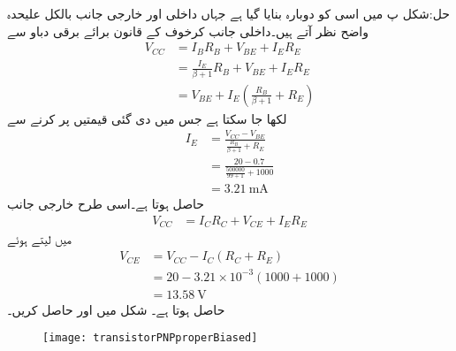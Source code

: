 حل:شکل  پ میں اسی کو دوبارہ بنایا گیا ہے جہاں داخلی اور خارجی جانب بالکل علیحدہ واضح نظر آتے ہیں۔داخلی جانب کرخوف کے قانون برائے برقی دباو سے
\begin{align*}
V_{CC}&=I_B R_B +V_{BE}+I_E R_E \\
&=\frac{I_E}{\beta +1} R_B + V_{BE}+I_E R_E\\
&=V_{BE}+I_E \left(\frac{R_B}{\beta+1}+R_E \right)
\end{align*}
لکھا جا سکتا ہے جس میں دی گئی قیمتیں پر کرنے سے
\begin{align*}
I_E&=\frac{V_{CC}-V_{BE}}{\frac{R_B}{\beta+1}+R_E}\\
&=\frac{20-0.7}{\frac{500000}{99+1}+1000}\\
&=\SI{3.21}{\milli \ampere}
\end{align*}
حاصل ہوتا ہے۔اسی طرح خارجی جانب 
\begin{align*}
V_{CC}&=I_C R_C +V_{CE}+I_E R_E
\end{align*}
میں  لیتے ہوئے
\begin{align*}
V_{CE}&=V_{CC}-I_C \left(R_C+R_E \right)\\
&=20-3.21 \times 10^{-3} \left(1000+1000 \right)\\
&=\SI{13.58}{\volt}
\end{align*}
حاصل ہوتا ہے۔
شکل  میں  اور  حاصل کریں۔
\begin{figure}
\centering
\texttt{[image: transistorPNPproperBiased]}
\caption{}
\label{شکل_ایک_منبع_سے_نکتہ_کارکردگی_کا_حصول_الف}
\end{figure}

